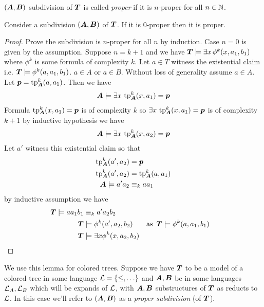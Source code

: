 \documentclass{amsart}
\DeclareMathOperator{\TT}{\boldface T}
\DeclareMathOperator{\A}{\boldface A}
\DeclareMathOperator{\B}{\boldface B}
\begin{document}
\begin{Definition}
	$(\A, \B)$ subdivision of $\TT$ is called \emph{proper} if it is $n$-proper for all $n \in \mathbb{N}$.
\end{Definition}

\begin{Lemma} \label{lm_subdivision}
	Consider a subdivision $(\A, \B)$ of $\TT$. If it is $0$-proper then it is proper.
\end{Lemma}

\begin{proof}
	Prove the subdivision is $n$-proper for all $n$ by induction. Case $n = 0$ is given by the assumption. Suppose $n = k + 1$ and we have $\TT \models \exists x \, \phi^k(x, a_1, b_1)$ where $\phi^k$ is some formula of complexity $k$. Let $a \in T$ witness the existential claim i.e. $\TT \models \phi^k(a, a_1, b_1)$. $a \in A$ or $a \in B$. Without loss of generality assume $a \in A$. Let $\pp = \tp^k_{\A} (a, a_1)$. Then we have 
	\begin{align*}
		\A \models \exists x \, \tp^k_{\A}(x, a_1) = \pp
	\end{align*}
	Formula $\tp^k_{\A}(x, a_1) = \pp$ is of complexity $k$ so $\exists x \, \tp^k_{\A}(x, a_1) = \pp$ is of complexity $k+1$ by inductive hypothesis we have
	\begin{align*}
		\A \models \exists x \, \tp^k_{\A}(x, a_2) = \pp
	\end{align*}
	Let $a'$ witness this existential claim so that  
	\begin{align*}
		\tp^k_{\A}(a', a_2) &= \pp \\
		\tp^k_{\A}(a', a_2) &= \tp^k_{\A}(a, a_1) \\
		\A \models a'a_2 &\equiv_k aa_1
	\end{align*}
	by inductive assumption we have
	\begin{align*}
		\TT \models aa_1b_1 &\equiv_k a'a_2b_2 \\
		\TT &\models \phi^k(a', a_2, b_2) & \text {as } \TT &\models \phi^k(a, a_1, b_1)\\
		\TT &\models \exists x \phi^k(x, a_2, b_2)
	\end{align*}
\end{proof}

We use this lemma for colored trees. Suppose we have $\TT$ to be a model of a colored tree in some language $\mathcal L = \{\leq, \ldots\}$ and $\A, \B$ be in some languages $\mathcal L_A, \mathcal L_B$ which will be expands of $\mathcal L$, with $\A, \B$ substructures of $\TT$ as reducts to $\mathcal L$. In this case we'll refer to $(\A, \B)$ as a \emph{proper subdivision} (of $\TT$).
\end{document}
